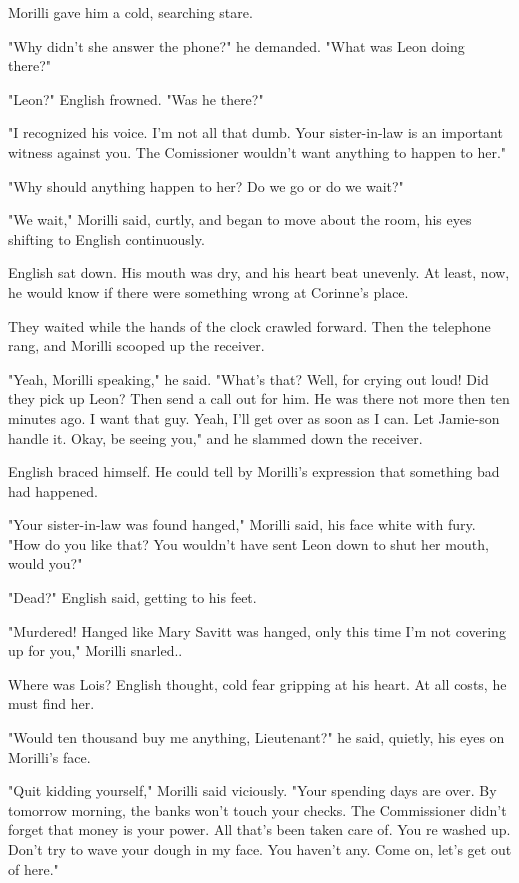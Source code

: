 \documentclass{novel}
\begin{document}
Morilli gave him a cold, searching stare.

"Why didn't she answer the phone?" he demanded. "What was Leon doing there?"

"Leon?" English frowned. "Was he there?"

"I recognized his voice. I'm not all that dumb. Your sister-in-law is an important witness against you. The Comissioner wouldn't want anything to happen to her."

"Why should anything happen to her? Do we go or do we wait?"

"We wait," Morilli said, curtly, and began to move about the room, his eyes shifting to English continuously.

English sat down. His mouth was dry, and his heart beat unevenly. At least, now, he would know if there were something wrong at Corinne's place.

They waited while the hands of the clock crawled forward. Then the telephone rang, and Morilli scooped up the receiver.

"Yeah, Morilli speaking," he said. "What's that? Well, for crying out loud! Did they pick up Leon? Then send a call out for him. He was there not more then ten minutes ago. I want that guy. Yeah, I'll get over as soon as I can. Let Jamie-son handle it. Okay, be seeing you," and he slammed down the receiver.

English braced himself. He could tell by Morilli's expression that something bad had happened.

"Your sister-in-law was found hanged," Morilli said, his face white with fury. "How do you like that? You wouldn't have sent Leon down to shut her mouth, would you?"

"Dead?" English said, getting to his feet.

"Murdered! Hanged like Mary Savitt was hanged, only this time I'm not covering up for you," Morilli snarled..

Where was Lois? English thought, cold fear gripping at his heart. At all costs, he must find her.

"Would ten thousand buy me anything, Lieutenant?" he said, quietly, his eyes on Morilli's face.

"Quit kidding yourself," Morilli said viciously. "Your spending days are over. By tomorrow morning, the banks won't touch your checks. The Commissioner didn't forget that money is your power. All that's been taken care of. You re washed up. Don't try to wave your dough in my face. You haven't any. Come on, let's get out of here."
\end{document}
